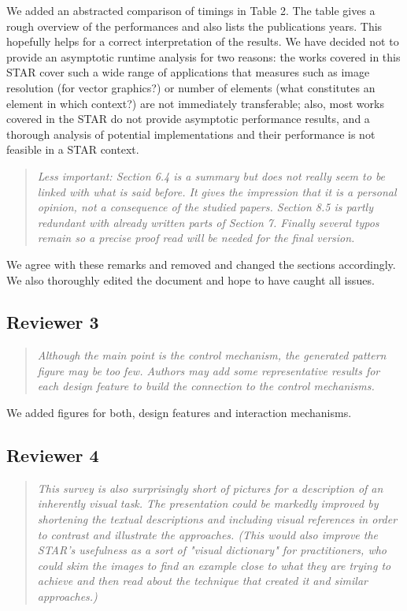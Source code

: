 \documentclass{egpubl}
\newcommand{\rev}[2]{{\color{greenrev}\textsuperscript{#1}#2}}
\renewcommand{\rev}[2]{{#2}}
\begin{document}
\rev{}{We added an abstracted comparison of timings in Table 2. The table gives a rough overview of the performances and also lists the publications years. This hopefully helps for a correct interpretation of the results. We have decided not to provide an asymptotic runtime analysis for two reasons: the works covered in this STAR cover such a wide range of applications that measures such as image resolution (for vector graphics?) or number of elements (what constitutes an element in which context?) are not immediately transferable; also, most works covered in the STAR do not provide asymptotic performance results, and a thorough analysis of potential implementations and their performance is not feasible in a STAR context.}

\begin{quote}
\emph{Less important: Section 6.4 is a summary but does not really seem to be linked with what is said before. It gives the impression that it is a personal opinion, not a consequence of the studied papers. Section 8.5 is partly redundant with already written parts of Section 7. Finally several typos remain so a precise proof read will be needed for the final version.}
\end{quote}

\rev{}{We agree with these remarks and removed and changed the sections accordingly. We also thoroughly edited the document and hope to have caught all issues.}


\subsection*{Reviewer 3}


\begin{quote}
\emph{Although the main point is the control mechanism, the generated pattern figure may be too few. Authors may add some representative results for each design feature to build the connection to the control mechanisms.}
\end{quote}

\rev{}{We added figures for both, design features and interaction mechanisms.}


\subsection*{Reviewer 4} 

\begin{quote}
\emph{This survey is also surprisingly short of pictures for a description of an inherently visual task. The presentation could be markedly improved by shortening the textual descriptions and including visual references in order to contrast and illustrate the approaches. (This would also improve the STAR's usefulness as a sort of "visual dictionary" for practitioners, who could skim the images to find an example close to what they are trying to achieve and then read about the technique that created it and similar approaches.)}
\end{quote}
\end{document}
